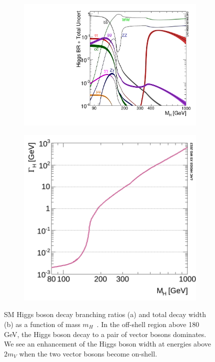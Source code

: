 \begin{figure}[!hbt]
\centering
\begin{subfigure}[t]{0.45\textwidth}
    \includegraphics[width=\textwidth]{figures/Higgs_BR.pdf}
    \caption{}
    \label{fig:HiggsBR}
\end{subfigure}
\begin{subfigure}[t]{0.45\textwidth}
    \includegraphics[width=\textwidth]{figures/SM_Width.png}
    \caption{}
    \label{fig:SMwidth}
\end{subfigure}
\caption{SM Higgs boson decay branching ratios (a) and total decay width (b) as a function of mass $m_{H}$~\cite{YR4}. In the off-shell region above 180 GeV, the Higgs boson decay to a pair of vector bosons dominates. We see an enhancement of the Higgs boson width at energies above $2m_V$ when the two vector bosons become on-shell.}
\label{fig:HiggsDecay}
\end{figure}

